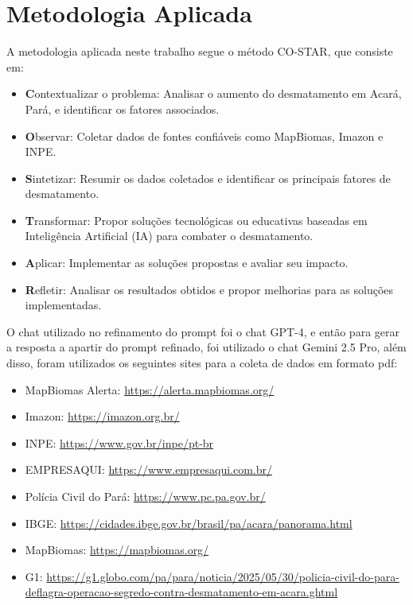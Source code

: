 \documentclass[12pt, a4paper, onecolumn, notitlepage]{article}
\begin{document}
    \section{Metodologia Aplicada}
    A metodologia aplicada neste trabalho segue o método CO-STAR, que consiste em:
    \begin{itemize}
        \item \textbf{C}ontextualizar o problema: Analisar o aumento do desmatamento em Acará, Pará, e identificar os fatores associados.
        \item \textbf{O}bservar: Coletar dados de fontes confiáveis como MapBiomas, Imazon e INPE.
        \item \textbf{S}intetizar: Resumir os dados coletados e identificar os principais fatores de desmatamento.
        \item \textbf{T}ransformar: Propor soluções tecnológicas ou educativas baseadas em Inteligência Artificial (IA) para combater o desmatamento.
        \item \textbf{A}plicar: Implementar as soluções propostas e avaliar seu impacto.
        \item \textbf{R}efletir: Analisar os resultados obtidos e propor melhorias para as soluções implementadas.
    \end{itemize}

    O chat utilizado no refinamento do prompt foi o chat GPT-4, e então para gerar a resposta a apartir do prompt refinado, foi utilizado o chat Gemini 2.5 Pro, além disso, foram utilizados os seguintes sites para a coleta de dados em formato pdf:
    \begin{itemize}
        \item MapBiomas Alerta: \url{https://alerta.mapbiomas.org/}
        \item Imazon: \url{https://imazon.org.br/}
        \item INPE: \url{https://www.gov.br/inpe/pt-br}
        \item EMPRESAQUI: \url{https://www.empresaqui.com.br/}
        \item Polícia Civil do Pará: \url{https://www.pc.pa.gov.br/}
        \item IBGE: \url{https://cidades.ibge.gov.br/brasil/pa/acara/panorama.html}
        \item MapBiomas: \url{https://mapbiomas.org/}
        \item G1: \url{https://g1.globo.com/pa/para/noticia/2025/05/30/policia-civil-do-para-deflagra-operacao-segredo-contra-desmatamento-em-acara.ghtml}
    \end{itemize}
\end{document}
